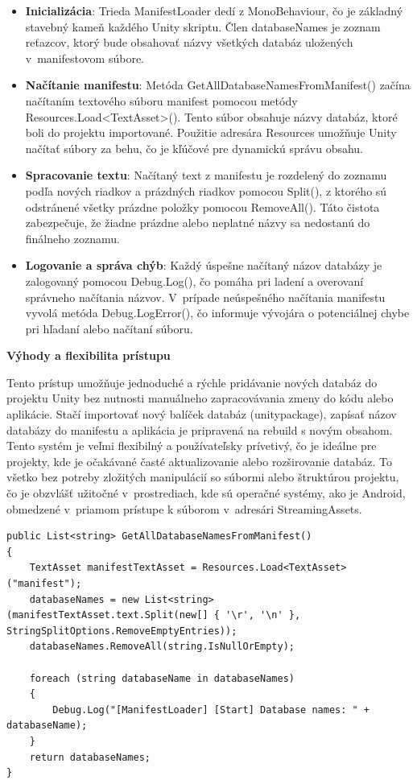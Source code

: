 \begin{itemize}
    \item {\small\textbf{Inicializácia}}: Trieda ManifestLoader dedí z MonoBehaviour, čo je základný stavebný kameň každého Unity skriptu. Člen databaseNames je zoznam reťazcov, ktorý bude obsahovať názvy všetkých databáz uložených v~manifestovom súbore.
    \item {\small\textbf{Načítanie manifestu}}: Metóda GetAllDatabaseNamesFromManifest() začína načítaním textového súboru manifest pomocou metódy Resources.Load<TextAsset>(). Tento súbor obsahuje názvy databáz, ktoré boli do projektu importované. Použitie adresára Resources umožňuje Unity načítať súbory za behu, čo je kľúčové pre dynamickú správu obsahu.
    \item {\small\textbf{Spracovanie textu}}: Načítaný text z manifestu je rozdelený do zoznamu podľa nových riadkov a prázdných riadkov pomocou Split(), z ktorého sú odstránené všetky prázdne položky pomocou RemoveAll(). Táto čistota zabezpečuje, že žiadne prázdne alebo neplatné názvy sa nedostanú do finálneho zoznamu.
    \item {\small\textbf{Logovanie a správa chýb}}: Každý úspešne načítaný názov databázy je zalogovaný pomocou Debug.Log(), čo pomáha pri ladení a overovaní správneho načítania názvov. V~prípade neúspešného načítania manifestu vyvolá metóda Debug.LogError(), čo informuje vývojára o potenciálnej chybe pri hľadaní alebo načítaní súboru.
\end{itemize}

{\normalsize\textbf{Výhody a flexibilita prístupu}}

Tento prístup umožňuje jednoduché a rýchle pridávanie nových databáz do projektu Unity bez nutnosti manuálneho zapracovávania zmeny do kódu alebo aplikácie. Stačí importovať nový balíček databáz (unitypackage), zapísať názov databázy do manifestu a aplikácia je pripravená na rebuild s novým obsahom. Tento systém je veľmi flexibilný a používateľsky prívetivý, čo je ideálne pre projekty, kde je očakávané časté aktualizovanie alebo rozširovanie databáz. To všetko bez potreby zložitých manipulácií so súbormi alebo štruktúrou projektu, čo je obzvlášť užitočné v~prostrediach, kde sú operačné systémy, ako je Android, obmedzené v~priamom prístupe k súborom v~adresári StreamingAssets.

\lstset{style=Csharp}
\begin{lstlisting}[caption={ManifestLoader Class - Čítanie databáz zo súboru Manifest}, label=manifestLoader]
public List<string> GetAllDatabaseNamesFromManifest()
{
    TextAsset manifestTextAsset = Resources.Load<TextAsset>("manifest");
    databaseNames = new List<string>(manifestTextAsset.text.Split(new[] { '\r', '\n' }, StringSplitOptions.RemoveEmptyEntries));
    databaseNames.RemoveAll(string.IsNullOrEmpty);

    foreach (string databaseName in databaseNames)
    {
        Debug.Log("[ManifestLoader] [Start] Database names: " + databaseName);
    }
    return databaseNames;
}
\end{lstlisting} 

